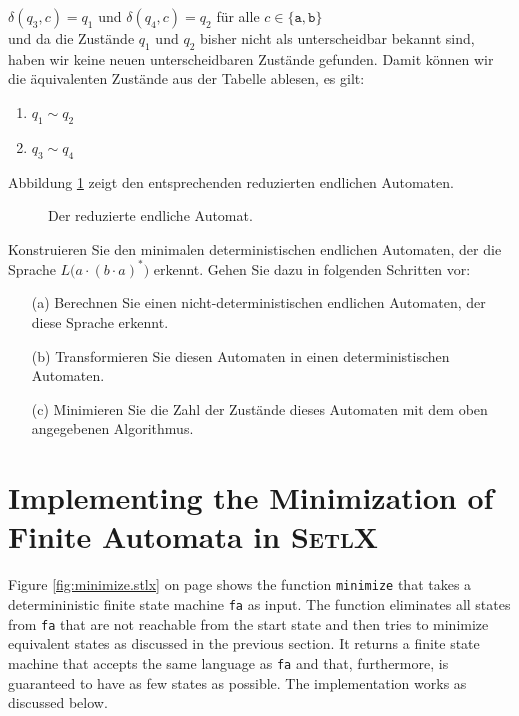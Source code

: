 \begin{enumerate}
      $\delta(q_3,c) = q_1$ \quad und \quad $\delta(q_4,c) = q_2$ \quad f\"ur alle $c \in \{\texttt{a}, \texttt{b}\}$
      \\[0.2cm]
      und da die Zust\"ande $q_1$ und $q_2$ bisher nicht als unterscheidbar bekannt sind,
      haben wir keine neuen unterscheidbaren Zust\"ande gefunden.
      Damit k\"onnen wir die \"aquivalenten Zust\"ande aus der Tabelle ablesen, es gilt:
      \begin{enumerate}
      \item $q_1 \sim q_2$
      \item $q_3 \sim q_4$
      \end{enumerate}
      Abbildung \ref{fig:gleichwertig.dot} zeigt den entsprechenden reduzierten endlichen
      Automaten.
\end{enumerate}

\begin{figure}[!ht]
  \centering
   \caption{Der reduzierte endliche Automat.}
  \label{fig:gleichwertig.dot}
\end{figure}



\exercise
Konstruieren Sie den minimalen deterministischen endlichen Automaten, der die Sprache \linebreak
$L\bigl(a \cdot (b \cdot a)^*\bigr)$ erkennt.  Gehen Sie dazu in folgenden Schritten vor:
\begin{enumerate}
\item[(a)] Berechnen Sie einen nicht-deterministischen endlichen Automaten, der diese Sprache
           erkennt.
\item[(b)] Transformieren Sie diesen Automaten in einen deterministischen Automaten.
\item[(c)] Minimieren Sie die Zahl der Zust\"ande dieses Automaten mit dem oben angegebenen Algorithmus.
\end{enumerate}

\section{Implementing  the Minimization  of Finite Automata in \textsc{SetlX}}
Figure \ref{fig:minimize.stlx} on page \pageref{fig:minimize.stlx} shows the function
\texttt{minimize} that takes a determininistic finite state machine \texttt{fa} as input.
The function eliminates all states from \texttt{fa} that are not reachable from the start
state and then tries to minimize equivalent states as discussed in the previous section.
It returns a finite state machine that accepts the same language as \texttt{fa} and that,
furthermore, is guaranteed to have as few states as possible.  The implementation works as
discussed below.

